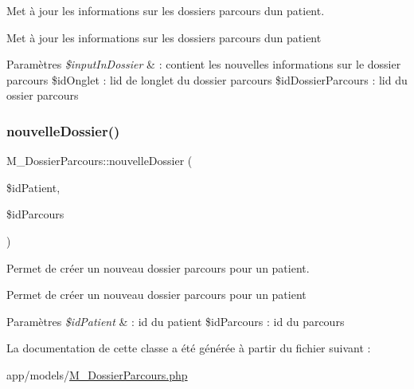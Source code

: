 Met à jour les informations sur les dossiers parcours d\textquotesingle{}un patient. 

Met à jour les informations sur les dossiers parcours d\textquotesingle{}un patient 
\begin{DoxyParams}{Paramètres}
{\em \$input\+In\+Dossier} & \+: contient les nouvelles informations sur le dossier parcours \$id\+Onglet \+: l\textquotesingle{}id de l\textquotesingle{}onglet du dossier parcours \$id\+Dossier\+Parcours \+: l\textquotesingle{}id du ossier parcours \\
\hline
\end{DoxyParams}
\mbox{\label{class_m___dossier_parcours_ad7cea95b8946b1d10c6b203566edd6d9}} 
\subsubsection{\texorpdfstring{nouvelle\+Dossier()}{nouvelleDossier()}}
{\footnotesize\ttfamily M\+\_\+\+Dossier\+Parcours\+::nouvelle\+Dossier (\begin{DoxyParamCaption}\item[{}]{\$id\+Patient,  }\item[{}]{\$id\+Parcours }\end{DoxyParamCaption})}



Permet de créer un nouveau dossier parcours pour un patient. 

Permet de créer un nouveau dossier parcours pour un patient 
\begin{DoxyParams}{Paramètres}
{\em \$id\+Patient} & \+: id du patient \$id\+Parcours \+: id du parcours \\
\hline
\end{DoxyParams}


La documentation de cette classe a été générée à partir du fichier suivant \+:\begin{DoxyCompactItemize}
\item 
app/models/\hyperlink{_m___dossier_parcours_8php}{M\+\_\+\+Dossier\+Parcours.\+php}\end{DoxyCompactItemize}
